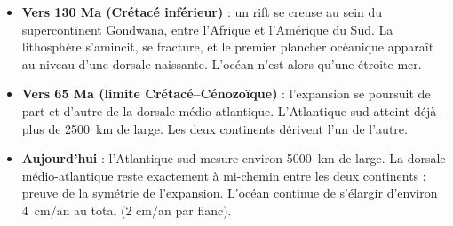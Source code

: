 \documentclass[11pt]{article}
\begin{document}
\begin{itemize}
\item \textbf{Vers 130 Ma (Crétacé inférieur)} : un rift se creuse au sein du supercontinent Gondwana, entre l'Afrique et l'Amérique du Sud. La lithosphère s'amincit, se fracture, et le premier plancher océanique apparaît au niveau d'une dorsale naissante. L'océan n'est alors qu'une étroite mer.
\item \textbf{Vers 65 Ma (limite Crétacé--Cénozoïque)} : l'expansion se poursuit de part et d'autre de la dorsale médio-atlantique. L'Atlantique sud atteint déjà plus de \SI{2500}{km} de large. Les deux continents dérivent l'un de l'autre.
\item \textbf{Aujourd'hui} : l'Atlantique sud mesure environ \SI{5000}{km} de large. La dorsale médio-atlantique reste exactement à mi-chemin entre les deux continents : preuve de la symétrie de l'expansion. L'océan continue de s'élargir d'environ \SI{4}{cm/an} au total (2 cm/an par flanc).
\end{itemize}
\end{document}

